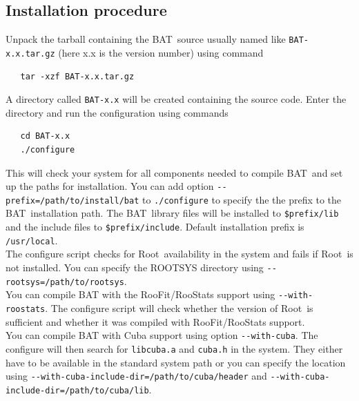\documentclass[11pt, a4paper]{article}
\newcommand{\bat}{{\sc BAT}}
\newcommand{\Root}{{\sc Root}}
\begin{document}

\subsection{Installation procedure}

Unpack the tarball containing the \bat\ source usually named like
\verb|BAT-x.x.tar.gz| (here x.x is the version number) using command
%
\begin{verbatim}
   tar -xzf BAT-x.x.tar.gz
\end{verbatim}
%
A directory called \verb|BAT-x.x| will be created containing the source code.
Enter the directory and run the configuration using commands
%
\begin{verbatim}
   cd BAT-x.x
   ./configure
\end{verbatim}

\noindent 
This will check your system for all components needed to compile \bat\
and set up the paths for installation. You can add option
\verb|--prefix=/path/to/install/bat| to \verb|./configure| to specify
the the prefix to the \bat\ installation path. The \bat\ library files
will be installed to \verb|$prefix/lib| and the include files to
\verb|$prefix/include|. Default installation prefix is
\verb|/usr/local|. \\

\noindent
The configure script checks for \Root\ availability in the system and
fails if \Root\ is not installed. You can specify the ROOTSYS directory
using \verb|--rootsys=/path/to/rootsys|. \\

\noindent
You can compile BAT with the RooFit/RooStats support using
\verb|--with-roostats|. The configure script will check whether the version of
\Root\ is sufficient and whether it was compiled with RooFit/RooStats
support. \\

\noindent
You can compile BAT with Cuba support using option \verb|--with-cuba|.
The configure will then search for \verb|libcuba.a| and \verb|cuba.h| in
the system. They either have to be available in the standard system path
or you can specify the location using
\verb|--with-cuba-include-dir=/path/to/cuba/header|
and \verb|--with-cuba-include-dir=/path/to/cuba/lib|. \\
\end{document}
